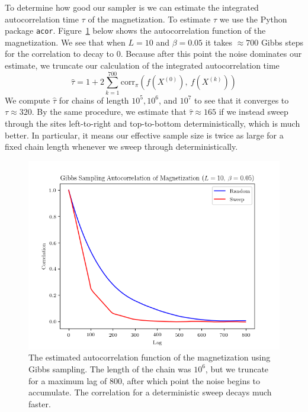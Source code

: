 \documentclass[11pt,a4paper]{amsart}
\begin{document}
\par To determine how good our sampler is we can estimate the integrated autocorrelation time $\tau$ of the magnetization. To estimate $\tau$ we use the Python package {\tt acor}.  Figure~\ref{fig:gibbsRandomACFb005} below shows the autocorrelation function of the magnetization.  We see that when $L = 10$ and $\beta = 0.05$ it takes $\approx 700$ Gibbs steps for the correlation to decay to 0.  Because after this point the noise dominates our estimate, we truncate our calculation of the integrated autocorrelation time
\[
\hat{\tau} = 1+ 2\sum_{k=1}^{700}\text{corr}_{\pi}(f(X^{(0)}),\  f(X^{(k)}))
\]
We compute $\hat{\tau}$ for chains of length $10^{5},10^6$, and $10^7$ to see that it converges to $\tau \approx 320$.  By the same procedure, we estimate that $\hat{\tau} \approx 165$ if we instead sweep through the sites left-to-right and top-to-bottom deterministically, which is much better.  In particular, it means our effective sample size is twice as large for a fixed chain length whenever we sweep through deterministically.

\begin{figure}[H]
\centering
\includegraphics[width=5in]{gibbsRandomACFb005.png}
\caption{The estimated autocorrelation function of the magnetization using Gibbs sampling.  The length of the chain was $10^6$, but we truncate for a maximum lag of 800, after which point the noise begins to accumulate.  The correlation for a deterministic sweep decays much faster.}
\label{fig:gibbsRandomACFb005}
\end{figure}




\end{document}
